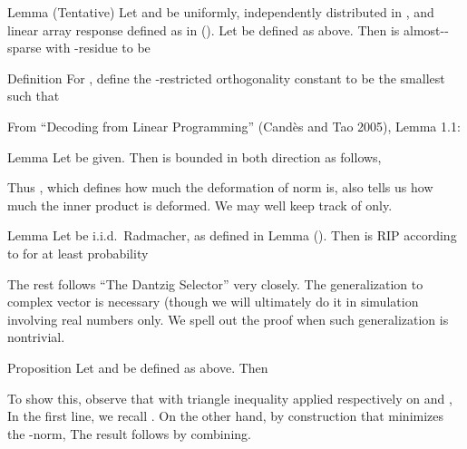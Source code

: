 \Result
{Lemma (Tentative)}
{
Let \m {\f} and \m {\th} be uniformly, independently distributed in \m {[0,2\pi)}, and linear array response  defined as in ().
Let  be defined as above.
Then  is almost--sparse with -residue  to be
}

\startsection [title={Design of RIP Precoders and Combiners}]

\Result
{Definition}
{
For , define the -restricted orthogonality constant  to be the smallest such that
}

From ``Decoding from Linear Programming'' (Cand\`es and Tao 2005), Lemma 1.1:

\Result
{Lemma}
{
Let  be given.
Then  is bounded in both direction as follows,
}

Thus , which defines how much the deformation of norm is, also tells us how much the inner product is deformed.
We may well keep track of  only.

\Result
{Lemma}
{
Let  be i.i.d.\ Radmacher, as defined in Lemma ().
Then  is RIP according to \m {\d} for at least probability
}

\color[red]{(To be done)}

\startsection [title={DS for Complex Vectors}]

The rest follows ``The Dantzig Selector'' very closely.
The generalization to complex vector is necessary (though we will ultimately do it in simulation involving real numbers only.
We spell out the proof when such generalization is nontrivial.

\Result
{Proposition}
{
Let  and  be defined as above.
Then
}

To show this, observe that with triangle inequality applied respectively on  and ,
In the first line, we recall .
On the other hand, by construction that  minimizes the -norm,
The result follows by combining.


